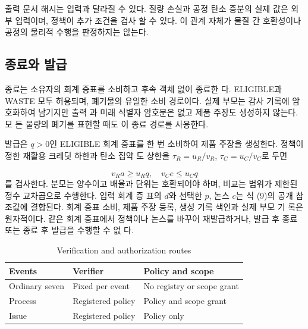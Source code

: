 출력 문서 해시는 입력과 달라질 수 있다. 질량 손실과 공정
탄소 증분의 실제 값은 외부 입력이며, 정책이 추가 조건을 검사
할 수 있다. 이 관계 자체가 물질 간 호환성이나 공정의 물리적
수행을 판정하지는 않는다.


\subsection{종료와 발급}
종료는 소유자의 회계 증표를 소비하고 후속 객체 없이 종료한
다. ELIGIBLE과 WASTE 모두 허용되며, 폐기물의 유일한 소비
경로이다. 실제 부모는 감사 기록에 암호화하여 남기지만 출력
과 미래 식별자 암호문은 없고 제품 주장도 생성하지 않는다. 모
든 물량의 폐기를 표현할 때도 이 종료 경로를 사용한다.

발급은 \(q>0\)인 ELIGIBLE 회계 증표를 한 번 소비하여 제품
주장을 생성한다. 정책이 정한 재활용 크레딧 하한과 탄소 집약
도 상한을 \(τ_{R}=u_{R}/v_{R}\), \(τ_{C}=u_{C}/v_{C}\)로 두면

\begin{equation}
    v_Ra\ge u_Rq,\quad v_Ce\le u_Cq\tag{20}
\end{equation}
를 검사한다. 분모는 양수이고 배율과 단위는 호환되어야 하며,
비교는 범위가 제한된 정수 교차곱으로 수행한다. 입력 회계 증
표의 \(d\)와 선택한 \(p\), 논스 \(c\)는 식 (9)의 공개 참조값에 결합된다.
회계 증표 소비, 제품 주장 등록, 생성 기록 색인과 실제 부모 기
록은 원자적이다. 같은 회계 증표에서 정책이나 논스를 바꾸어
재발급하거나, 발급 후 종료 또는 종료 후 발급을 수행할 수 없
다.


\begin{table}[htbp]\centering\small
    \setcounter{table}{1}\caption{Verification and authorization routes}
    \begin{tabularx}{\linewidth}{@{}XXX@{}}\toprule
        \textbf{Events} & \textbf{Verifier} & \textbf{Policy and scope}  \\ \midrule
        Ordinary seven  & Fixed per event   & No registry or scope grant \\
        Process         & Registered policy & Policy and scope grant     \\
        Issue           & Registered policy & Policy only                \\
        \bottomrule\end{tabularx}\end{table}

